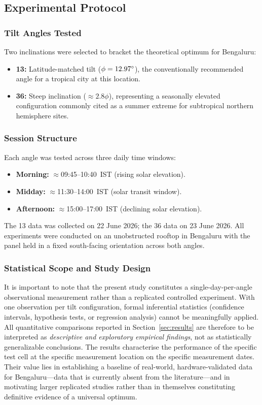 \documentclass[conference]{IEEEtran}
\begin{document}
\subsection{Experimental Protocol}

\subsubsection{Tilt Angles Tested}
Two inclinations were selected to bracket the theoretical optimum for Bengaluru:
\begin{itemize}
  \item \textbf{13\degree{}:} Latitude-matched tilt ($\phi = 12.97\degree{}$), the
        conventionally recommended angle for a tropical city at this location.
  \item \textbf{36\degree{}:} Steep inclination ($\approx 2.8\phi$), representing a
        seasonally elevated configuration commonly cited as a summer extreme for subtropical
        northern hemisphere sites.
\end{itemize}

\subsubsection{Session Structure}
Each angle was tested across three daily time windows:
\begin{itemize}
  \item \textbf{Morning:} $\approx$09:45--10:40~IST (rising solar elevation).
  \item \textbf{Midday:} $\approx$11:30--14:00~IST (solar transit window).
  \item \textbf{Afternoon:} $\approx$15:00--17:00~IST (declining solar elevation).
\end{itemize}
The 13\degree{} data was collected on 22 June 2026; the 36\degree{} data on 23 June 2026.
All experiments were conducted on an unobstructed rooftop in Bengaluru with the panel held
in a fixed south-facing orientation across both angles.

\subsubsection{Statistical Scope and Study Design}
It is important to note that the present study constitutes a single-day-per-angle
observational measurement rather than a replicated controlled experiment. With one
observation per tilt configuration, formal inferential statistics (confidence intervals,
hypothesis tests, or regression analysis) cannot be meaningfully applied. All quantitative
comparisons reported in Section~\ref{sec:results} are therefore to be interpreted as
\textit{descriptive and exploratory empirical findings}, not as statistically generalizable
conclusions. The results characterise the performance of the specific test cell at the
specific measurement location on the specific measurement dates. Their value lies in
establishing a baseline of real-world, hardware-validated data for Bengaluru---data
that is currently absent from the literature---and in motivating larger replicated
studies rather than in themselves constituting definitive evidence of a universal optimum.
\end{document}

